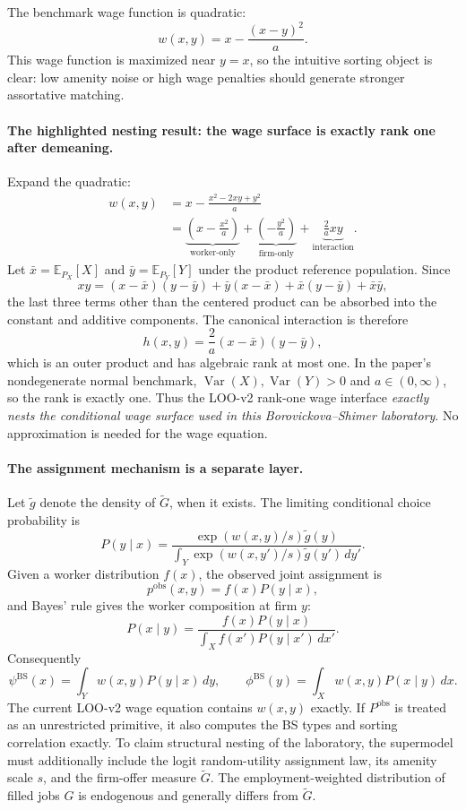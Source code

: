 \documentclass[11pt]{article}
\newcommand{\E}{\mathbb{E}}
\newcommand{\Var}{\operatorname{Var}}
\begin{document}
The benchmark wage function is quadratic:
\[
  w(x,y)=x-\frac{(x-y)^2}{a}.
\]
This wage function is maximized near $y=x$, so the intuitive sorting object is clear: low amenity noise or high wage penalties should generate stronger assortative matching.

\paragraph{The highlighted nesting result: the wage surface is exactly rank one after demeaning.}
Expand the quadratic:
\begin{align*}
w(x,y)
&=x-\frac{x^2-2xy+y^2}{a}\\
&=\underbrace{\left(x-\frac{x^2}{a}\right)}_{\text{worker-only}}
+\underbrace{\left(-\frac{y^2}{a}\right)}_{\text{firm-only}}
+\underbrace{\frac{2}{a}xy}_{\text{interaction}}.
\end{align*}
Let \(\bar x=\E_{P_X}[X]\) and \(\bar y=\E_{P_Y}[Y]\) under the product
reference population.  Since
\[
xy=(x-\bar x)(y-\bar y)+\bar y(x-\bar x)
+\bar x(y-\bar y)+\bar x\bar y,
\]
the last three terms other than the centered product can be absorbed into the
constant and additive components.  The canonical interaction is therefore
\[
\boxed{
h(x,y)=\frac{2}{a}(x-\bar x)(y-\bar y),
}
\tag{BS-discrete-choice-rank-one}
\]
which is an outer product and has algebraic rank at most one.  In the paper's
nondegenerate normal benchmark, \(\Var(X),\Var(Y)>0\) and
\(a\in(0,\infty)\),
so the rank is exactly one.  Thus the LOO-v2 rank-one wage interface
\emph{exactly nests the conditional wage surface used in this
Borovickova--Shimer laboratory}.  No approximation is needed for the wage
equation.

\paragraph{The assignment mechanism is a separate layer.}
Let \(\widetilde g\) denote the density of \(\widetilde G\), when it exists.
The limiting conditional choice probability is
\[
P(y\mid x)
=
\frac{\exp(w(x,y)/s)\widetilde g(y)}
{\int_Y\exp(w(x,y')/s)\widetilde g(y')\,dy'}.
\tag{BS-logit-assignment}
\]
Given a worker distribution \(f(x)\), the observed joint assignment is
\[
p^{\mathrm{obs}}(x,y)=f(x)P(y\mid x),
\]
and Bayes' rule gives the worker composition at firm \(y\):
\[
P(x\mid y)
=
\frac{f(x)P(y\mid x)}
{\int_X f(x')P(y\mid x')\,dx'}.
\]
Consequently
\[
\psi^{\mathrm{BS}}(x)=\int_Yw(x,y)P(y\mid x)\,dy,
\qquad
\phi^{\mathrm{BS}}(y)=\int_Xw(x,y)P(x\mid y)\,dx.
\]
The current LOO-v2 wage equation contains \(w(x,y)\) exactly.  If
\(P^{\mathrm{obs}}\) is treated as an unrestricted primitive, it also computes
the BS types and sorting correlation exactly.  To claim structural nesting of
the laboratory, the supermodel must additionally include the logit random-utility
assignment law, its amenity scale \(s\), and the firm-offer measure
\(\widetilde G\).  The employment-weighted distribution of filled jobs
\(G\) is endogenous and generally differs from \(\widetilde G\).
\end{document}

